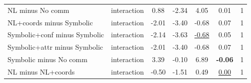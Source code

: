 \begin{tabular}{llccccc}
NL minus No comm & interaction & 0.88 & -2.34 & 4.05 & 0.01 & 1 \\
NL+coords minus Symbolic & interaction & -2.01 & -3.40 & -0.68 & 0.07 & 1 \\
Symbolic+conf minus Symbolic & interaction & -2.14 & -3.63 & \underline{-0.68} & 0.05 & 1 \\
Symbolic+attr minus Symbolic & interaction & -2.01 & -3.40 & -0.68 & 0.07 & 1 \\
Symbolic minus No comm & interaction & 3.39 & -0.10 & 6.89 & \textbf{-0.06} & 1 \\
NL minus NL+coords & interaction & -0.50 & -1.51 & 0.49 & \underline{0.00} & 1 \\
\bottomrule
\end{tabular}
